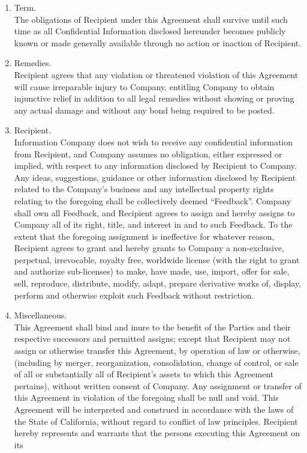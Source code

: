 \documentclass[letterpaper, 12pt]{article}
\begin{document}
\begin{enumerate}
    \item Term.\\
    The obligations of Recipient under this Agreement shall survive until such time as all Confidential Information disclosed hereunder
becomes publicly known or made generally available through no action or inaction of Recipient.
    \item Remedies.\\
    Recipient agrees that any violation or threatened violation of this Agreement will cause irreparable injury to Company, entitling Company to obtain injunctive relief in addition to all legal remedies without showing or proving any actual damage and without any bond being required to be posted.
    \item Recipient.\\
    Information Company does not wish to receive any confidential information from Recipient, and Company assumes no obligation,
either expressed or implied, with respect to any information disclosed by Recipient to Company. Any ideas, suggestions, guidance
or other information disclosed by Recipient related to the Company’s business and any intellectual property rights relating to the
foregoing shall be collectively deemed “Feedback”. Company shall own all Feedback, and Recipient agrees to assign and hereby
assigns to Company all of its right, title, and interest in and to such Feedback. To the extent that the foregoing assignment is
ineffective for whatever reason, Recipient agrees to grant and hereby grants to Company a non-exclusive, perpetual, irrevocable,
royalty free, worldwide license (with the right to grant and authorize sub-licenses) to make, have made, use, import, offer for sale, sell, reproduce, distribute,
modify, adapt, prepare derivative works of, display, perform and otherwise exploit such Feedback without restriction.
    \item Miscellaneous.\\
    This Agreement shall bind and inure to the benefit of the Parties and their respective successors and permitted assigns; except that Recipient may not assign or otherwise transfer this Agreement, by operation of law or otherwise, (including by merger, reorganization, consolidation, change of control, or sale of all or substantially all of Recipient’s assets to which this Agreement pertains), without written consent of Company. Any assignment or transfer of this Agreement in violation of the foregoing shall be null and void. This Agreement will be interpreted and construed in accordance with the laws of the State of California, without regard to conflict of law principles. Recipient hereby represents and warrants that the persons executing this Agreement on its

\end{enumerate}
\end{document}
